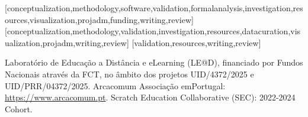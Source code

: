 \documentclass[english]{textolivre}
\begin{document}
\printbibliography\label{sec-bib}


\begin{contributors}
[conceptualization,methodology,software,validation,formalanalysis,investigation,resources,visualization,projadm,funding,writing,review]
[conceptualization,methodology,validation,investigation,resources,datacuration,visualization,projadm,writing,review]
[validation,resources,writing,review]
\end{contributors}


\begin{dataavailability}
\end{dataavailability}

\begin{funding}
Laboratório de Educação a Distância e eLearning (LE@D), financiado por Fundos Nacionais através da FCT, no âmbito dos projetos UID/4372/2025 e UID/PRR/04372/2025. Arcacomum Associação emPortugal: \url{https://www.arcacomum.pt}. Scratch Education Collaborative (SEC): 2022-2024 Cohort.
\end{funding}
\end{document}
